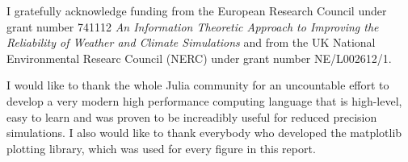 \begin{funding}

 I gratefully acknowledge funding from the European Research Council under grant number 741112 \emph{An Information Theoretic Approach to Improving the Reliability of Weather and Climate Simulations} and from the UK National Environmental Researc Council (NERC) under grant number NE/L002612/1.

 I would like to thank the whole Julia community for an uncountable effort to develop a very modern high performance computing language that is high-level, easy to learn and was proven to be increadibly useful for reduced precision simulations. I also would like to thank everybody who developed the matplotlib plotting library, which was used for every figure in this report.
 
\end{funding}
